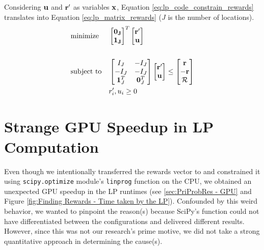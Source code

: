 \begin{appendices}
    Considering $\mathbf{u}$ and $\mathbf{r'}$ as variables $\mathbf{x}$, Equation \ref{eq:lp_code_constrain_rewards} translates into Equation \ref{eq:lp_matrix_rewards} ($J$ is the number of locations).
    \begin{equation} \label{eq:lp_matrix_rewards}
    \begin{aligned}
    & \text{minimize}
    & & \begin{bmatrix}
    \mathbf{0_J}\\
    \mathbf{1_J}\\
    \end{bmatrix}^T
    \begin{bmatrix}
    \mathbf{r'}\\
    \mathbf{u}
    \end{bmatrix}\\ \\
    & \text{subject to}
    & & \begin{bmatrix}
    I_J & -I_J\\
    -I_J & -I_J\\
    \mathbf{1}^T_J & \mathbf{0}^T_J\\
    \end{bmatrix}
    \begin{bmatrix}
    \mathbf{r'}\\
    \mathbf{u}\\
    \end{bmatrix} \leq
    \begin{bmatrix}
    \mathbf{r}\\
    -\mathbf{r}\\
    \mathcal{R}\\
    \end{bmatrix}\\
    &&& r'_i, u_i \geq 0
    \end{aligned}
    \end{equation}
    
    \section{Strange GPU Speedup in LP Computation} \label{sec:Strange GPU Speedup in LP Computation}
    Even though we intentionally transferred the rewards vector to and constrained it using \texttt{scipy.optimize} module's \texttt{linprog} function on the CPU, we obtained an unexpected GPU speedup in the LP runtimes (see \cref{sec:PriProbRes - GPU} and Figure \ref{fig:Finding Rewards - Time taken by the LP}). Confounded by this weird behavior, we wanted to pinpoint the reason(s) because SciPy's function could not have differentiated between the configurations and delivered different results. However, since this was not our research's prime motive, we did not take a strong quantitative approach in determining the cause(s).
    

\end{appendices}
